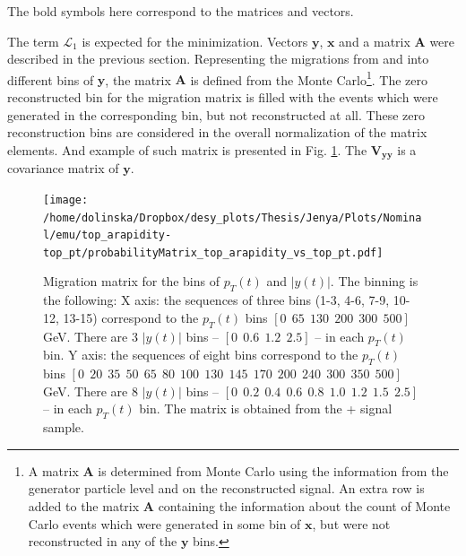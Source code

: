 The bold symbols here correspond to the matrices and vectors.

The term $\mathcal{L}_{1}$ is expected for the minimization. Vectors $\mathbf{y}$, $\mathbf{x}$ and a matrix $\mathbf{A}$ were
described in the previous section. Representing the migrations from and into different bins of $\mathbf{y}$, the matrix $\mathbf{A}$
is defined from the Monte Carlo\footnote{A matrix $\mathbf{A}$ is
determined from Monte Carlo using the information from the generator particle level and on the reconstructed signal. An extra row is added
to the matrix $\mathbf{A}$ containing the information about the count of Monte Carlo events which were generated in some bin of $\mathbf{x}$,
but were not reconstructed in any of the $\mathbf{y}$ bins.}. The zero reconstructed bin for the migration matrix is filled with the events
which were generated in the corresponding bin, but not reconstructed at all. These zero reconstruction bins are considered in the overall 
normalization of the matrix elements. And example of such matrix is presented in Fig. \ref{fig:migMat}.
The $\mathbf{V_{yy}}$ is a covariance matrix of $\mathbf{y}$. 

\begin{figure}[p]
  \centering
  \texttt{[image: /home/dolinska/Dropbox/desy\_plots/Thesis/Jenya/Plots/Nominal/emu/top\_arapidity-top\_pt/probabilityMatrix\_top\_arapidity\_vs\_top\_pt.pdf]}
  \caption{Migration matrix for the bins of $p_{T}(t)$ and $|y(t)|$. The binning is the following:
  X axis: the sequences of three bins (1-3, 4-6, 7-9, 10-12, 13-15) correspond to the $p_{T}(t)$ bins $[0\:\:65\:\:130\:\:200\:\:300\:\:500]$ GeV.
          There are 3 $|y(t)|$ bins -- $[0\:\:0.6\:\:1.2\:\:2.5]$ -- in each $p_{T}(t)$ bin.
  Y axis: the sequences of eight bins correspond to the $p_{T}(t)$ bins $[0\:\:20\:\:35\:\:50\:\:65\:\:80\:\:100\:\:130\:\:145\:\:170\:\:200\:\:240\:\:300\:\:350\:\:500]$ GeV.
          There are 8 $|y(t)|$ bins -- $[0\:\:0.2\:\:0.4\:\:0.6\:\:0.8\:\:1.0\:\:1.2\:\:1.5\:\:2.5]$ -- in each $p_{T}(t)$ bin.
  The matrix is obtained from the \MG +  signal sample.}
  \label{fig:migMat}
\end{figure}

